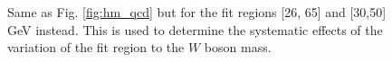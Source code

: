 \documentclass[a4paper]{report}
\numberwithin{equation}{section}
\begin{document}
\begin{figure}[htb!]
	\centering
	\quad
	\centering
	\caption{Same as Fig. \ref{fig:hm_qcd} but for the fit regions [26, 65] and [30,50] GeV instead. This is used to determine 
    the systematic effects of the variation of the fit region to the $W$ boson mass.}
	\label{fig:hm_fit}
\end{figure}
\end{document}
